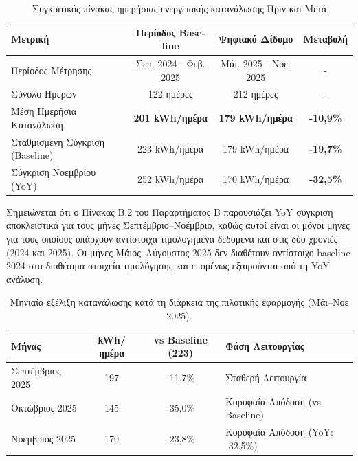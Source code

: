 \begin{table}[htbp]
\centering
\caption{Συγκριτικός πίνακας ημερήσιας ενεργειακής κατανάλωσης Πριν και Μετά}
\label{tab:energy_comparison}
\begin{tabular}{|l|c|c|c|}
\hline
\textbf{Μετρική} & \textbf{Περίοδος \textlatin{Baseline}} & \textbf{Ψηφιακό Δίδυμο} & \textbf{Μεταβολή} \\
\hline
Περίοδος Μέτρησης & Σεπ. 2024 - Φεβ. 2025 & Μάι. 2025 - Νοε. 2025 & - \\
\hline
Σύνολο Ημερών & 122 ημέρες & 212 ημέρες & - \\
\hline
Μέση Ημερήσια Κατανάλωση & \textbf{201 \textlatin{kWh}/ημέρα} & \textbf{179 \textlatin{kWh}/ημέρα} & \textbf{-10,9\%} \\
\hline
Σταθμισμένη Σύγκριση (\textlatin{Baseline}) & 223 \textlatin{kWh}/ημέρα & 179 \textlatin{kWh}/ημέρα & \textbf{-19,7\%} \\
\hline
Σύγκριση Νοεμβρίου (\textlatin{YoY}) & 252 \textlatin{kWh}/ημέρα & 170 \textlatin{kWh}/ημέρα & \textbf{-32,5\%} \\
\hline
\end{tabular}
\end{table}

Σημειώνεται ότι ο Πίνακας Β.2 του Παραρτήματος Β παρουσιάζει \textlatin{YoY} σύγκριση αποκλειστικά για τους μήνες Σεπτέμβριο--Νοέμβριο, καθώς αυτοί είναι οι μόνοι μήνες για τους οποίους υπάρχουν αντίστοιχα τιμολογημένα δεδομένα και στις δύο χρονιές (2024 και 2025). Οι μήνες Μάιος--Αύγουστος 2025 δεν διαθέτουν αντίστοιχο \textlatin{baseline} 2024 στα διαθέσιμα στοιχεία τιμολόγησης και επομένως εξαιρούνται από τη \textlatin{YoY} ανάλυση.

\begin{table}[htbp]
\centering
\caption{Μηνιαία εξέλιξη κατανάλωσης κατά τη διάρκεια της πιλοτικής εφαρμογής (Μάι--Νοε 2025).}
\label{tab:monthly_evolution}
\begin{tabular}{|l|c|c|l|}
\hline
\textbf{Μήνας} & \textbf{\textlatin{kWh}/ημέρα} & \textbf{\textlatin{vs Baseline (223)}} & \textbf{Φάση Λειτουργίας} \\
\hline
Σεπτέμβριος 2025 & 197 & -11,7\% & Σταθερή Λειτουργία \\
\hline
Οκτώβριος 2025 & 145 & -35,0\% & Κορυφαία Απόδοση (\textlatin{vs Baseline}) \\
\hline
Νοέμβριος 2025 & 170 & -23,8\% & Κορυφαία Απόδοση (\textlatin{YoY: -32,5\%}) \\
\hline
\end{tabular}
\end{table}


